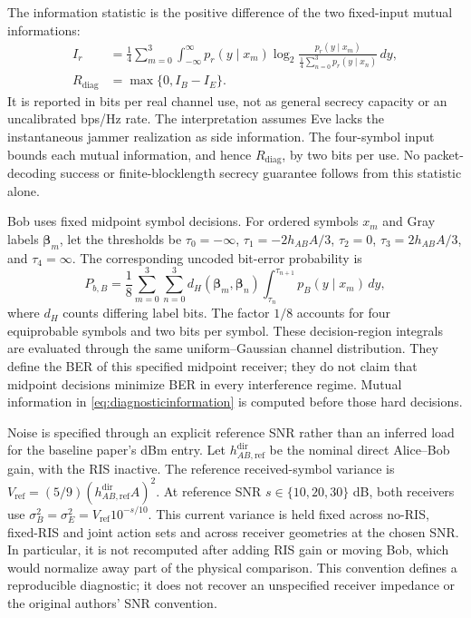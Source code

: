 The information statistic is the positive difference of the two fixed-input mutual informations:
\begin{equation}
\begin{aligned}
I_r&=\frac14\sum_{m=0}^{3}\int_{-\infty}^{\infty}
p_r(y\mid x_m)\log_2\frac{p_r(y\mid x_m)}{\frac14\sum_{n=0}^{3}p_r(y\mid x_n)}\,dy,\\
R_{\mathrm{diag}}&=\max\{0,I_B-I_E\}.
\end{aligned}
\label{eq:diagnosticinformation}
\end{equation}
It is reported in bits per real channel use, not as general secrecy capacity or an uncalibrated bps/Hz rate. The interpretation assumes Eve lacks the instantaneous jammer realization as side information. The four-symbol input bounds each mutual information, and hence $R_{\mathrm{diag}}$, by two bits per use. No packet-decoding success or finite-blocklength secrecy guarantee follows from this statistic alone.

Bob uses fixed midpoint symbol decisions. For ordered symbols $x_m$ and Gray labels $\boldsymbol{\beta}_m$, let the thresholds be $\tau_0=-\infty$, $\tau_1=-2h_{AB}A/3$, $\tau_2=0$, $\tau_3=2h_{AB}A/3$, and $\tau_4=\infty$. The corresponding uncoded bit-error probability is
\begin{equation}
P_{b,B}=\frac18\sum_{m=0}^{3}\sum_{n=0}^{3}
d_H(\boldsymbol{\beta}_m,\boldsymbol{\beta}_n)
\int_{\tau_n}^{\tau_{n+1}}p_B(y\mid x_m)\,dy,
\label{eq:diagnosticber}
\end{equation}
where $d_H$ counts differing label bits. The factor $1/8$ accounts for four equiprobable symbols and two bits per symbol. These decision-region integrals are evaluated through the same uniform--Gaussian channel distribution. They define the BER of this specified midpoint receiver; they do not claim that midpoint decisions minimize BER in every interference regime. Mutual information in \eqref{eq:diagnosticinformation} is computed before those hard decisions.

Noise is specified through an explicit reference SNR rather than an inferred load for the baseline paper's dBm entry. Let $h_{AB,\mathrm{ref}}^{\mathrm{dir}}$ be the nominal direct Alice--Bob gain, with the RIS inactive. The reference received-symbol variance is $V_{\mathrm{ref}}=(5/9)(h_{AB,\mathrm{ref}}^{\mathrm{dir}}A)^2$. At reference SNR $s\in\{10,20,30\}$ dB, both receivers use $\sigma_B^2=\sigma_E^2=V_{\mathrm{ref}}10^{-s/10}$. This current variance is held fixed across no-RIS, fixed-RIS and joint action sets and across receiver geometries at the chosen SNR. In particular, it is not recomputed after adding RIS gain or moving Bob, which would normalize away part of the physical comparison. This convention defines a reproducible diagnostic; it does not recover an unspecified receiver impedance or the original authors' SNR convention.

